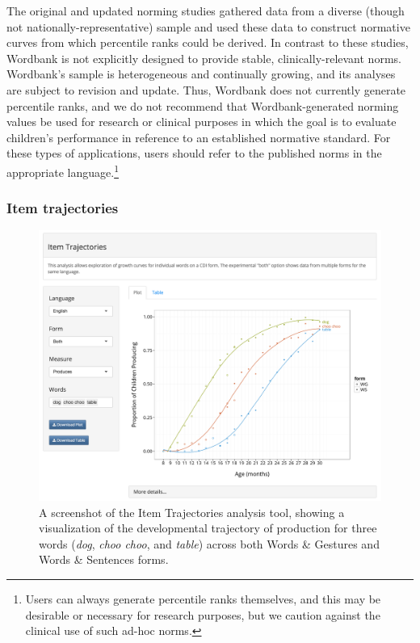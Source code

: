 \documentclass[man,noapacite]{apa}
\begin{document}
The original and updated norming studies \cite{fenson1993,fenson2007} gathered data from a diverse (though not nationally-representative) sample and used these data to construct normative curves from which percentile ranks could be derived. In contrast to these studies, Wordbank is not explicitly designed to provide stable, clinically-relevant norms. Wordbank's sample is heterogeneous and continually growing, and its analyses are subject to revision and update. Thus, Wordbank does not currently generate percentile ranks, and we do not recommend that Wordbank-generated norming values be used for research or clinical purposes in which the goal is to evaluate children's performance in reference to an established normative standard. For these types of applications, users should refer to the published norms in the appropriate language.\footnote{Users can always generate percentile ranks themselves, and this may be desirable or necessary for research purposes, but we caution against the clinical use of such ad-hoc norms.}

\subsubsection{Item trajectories}

\begin{figure}[h!]
\includegraphics[width=6in]{figures/itemsapp.png}
\caption{\label{fig:items} A screenshot of the Item Trajectories analysis tool, showing a visualization of the developmental trajectory of production for three words (\emph{dog}, \emph{choo choo}, and \emph{table}) across both Words \& Gestures and Words \& Sentences forms.}
\end{figure}
\end{document}
